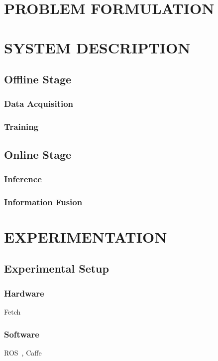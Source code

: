 \documentclass[letterpaper, 10 pt, conference]{ieeeconf}  %
\newcommand{\lorem}{
}
\begin{document}
\section{\label{sec-PF}PROBLEM FORMULATION}
  \lorem{}
\section{\label{sec-SD}SYSTEM DESCRIPTION}
  \subsection{Offline Stage}

    \subsubsection{Data Acquisition}

    \subsubsection{Training}

  \subsection{Online Stage}

    \subsubsection{Inference}

    \subsubsection{Information Fusion}
    \lorem{}

\section{\label{sec-EX}EXPERIMENTATION}
  \subsection{Experimental Setup}
    \subsubsection{Hardware}
      Fetch~\cite{ackerman2015fetch}
    \subsubsection{Software}
      ROS~\cite{quigley2009ros}, Caffe~\cite{jia2014caffe}
\end{document}
